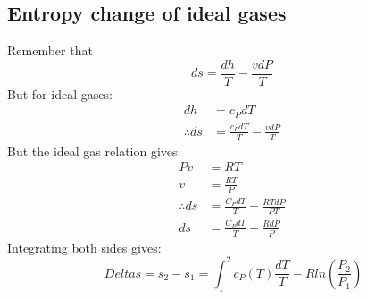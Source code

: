 \subsection{Entropy change of ideal gases}
Remember that
\begin{equation}
  ds = \frac{dh}{T} - \frac{vdP}{T}
\end{equation}
But for ideal gases:
\begin{align}
  dh            & = c_P dT                          \\
  \therefore ds & = \frac{c_PdT}{T} - \frac{vdP}{T}
\end{align}
But the ideal gas relation gives:
\begin{align}
  Pv            & =RT                                 \\
  v             & =\frac{RT}{P}                       \\
  \therefore ds & = \frac{C_PdT}{T} - \frac{RTdP}{PT} \\
  ds            & = \frac{C_PdT}{T} - \frac{RdP}{P}
\end{align}
Integrating both sides gives:
\begin{equation} \
  Delta s = s_2 - s_1 = \int_1^2 c_P(T)\frac{dT}{T} - Rln\left(\frac{P_2}{P_1}\right)
\end{equation}

